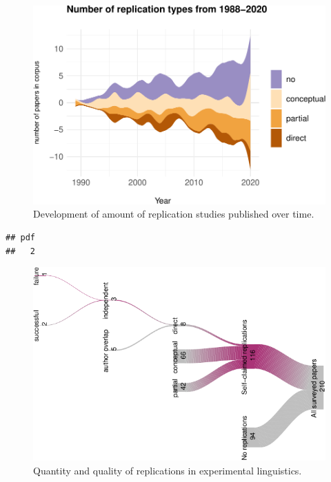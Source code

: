 \documentclass[]{elsarticle} %
\begin{document}
\begin{figure}

{\centering \includegraphics[width=1\linewidth]{ReplicationLing_files/figure-latex/stream_plot-1} 

}

\caption{Development of amount of replication studies published over time.}\label{fig:stream_plot}
\end{figure}

\begin{verbatim}
## pdf 
##   2
\end{verbatim}

\begin{figure}

{\centering \includegraphics{ReplicationLing_files/figure-latex/river_plot-1} 

}

\caption{Quantity and quality of replications in experimental linguistics.}\label{fig:river_plot}
\end{figure}
\end{document}
